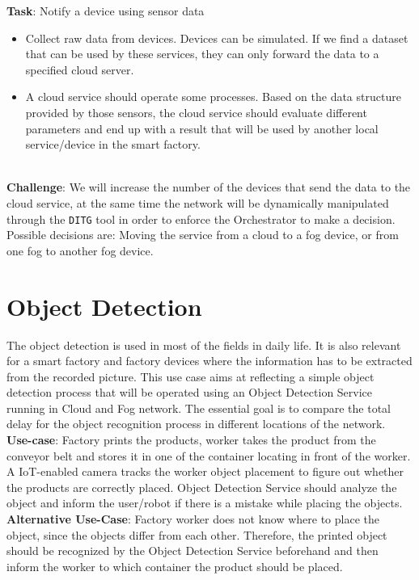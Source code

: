 \textbf{Task}: Notify a device using sensor data
\begin{itemize}
    \item Collect raw data from devices. Devices can be simulated. If we find a dataset that can be used by these services, they can only forward the data to a specified cloud server.
    \item A cloud service should operate some processes. Based on the data structure provided by those sensors, the cloud service should evaluate different parameters and end up with a result that will be used by another local service/device in the smart factory.
\end{itemize}
\\
\textbf{Challenge}: We will increase the number of the devices that send the data to the cloud service, at the same time the network will be dynamically manipulated through the \texttt{DITG} tool in order to enforce the Orchestrator to make a decision. Possible decisions are: Moving the service from a cloud to a fog device, or from one fog to another fog device.

\section{Object Detection}
The object detection is used in most of the fields in daily life. It is also relevant for a smart factory and factory devices where the information has to be extracted from the recorded picture. This use case aims at reflecting a simple object detection process that will be operated using an Object Detection Service running in Cloud and Fog network. The essential goal is to compare the total delay for the object recognition process in different locations of the network.\\

\textbf{Use-case}: Factory prints the products, worker takes the product from the conveyor belt and stores it in one of the container locating in front of the worker. A IoT-enabled camera tracks the worker object placement to figure out whether the products are correctly placed. Object Detection Service should analyze the object and inform the user/robot if there is a mistake while placing the objects.\\

\textbf{Alternative Use-Case}: Factory worker does not know where to place the object, since the objects differ from each other. Therefore, the printed object should be recognized by the Object Detection Service beforehand and then inform the worker to which container the product should be placed.\\

